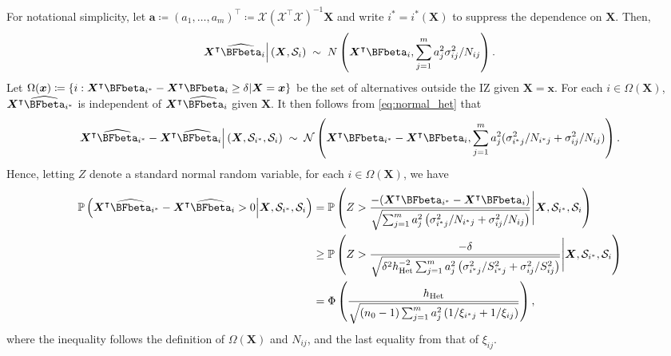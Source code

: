 \documentclass[ijoc,nonblindrev]{informs3}
\def\pr{\mathbb{P}}
\def\bx{{\bm x}}
\def\bX{{\bm X}}
\def\cN{{\mathcal N}}
\def\cX{{\mathcal X}}
\def\hhet{h_{\mathrm{Het}}}
\begin{document}
For notational simplicity, let $\bm a \coloneqq (a_1,\ldots,a_m)^\intercal \coloneqq \cX (\cX^\intercal \cX)^{-1} \bX$ and write $i^*=i^*(\bX)$ to suppress the dependence on $\bX$. Then,
\begin{equation}\label{eq:normal_het}
\bX^\intercal \widehat{\BFbeta}_i  \Big| \left(\bX, \mathcal{S}_i\right) \;\sim\;  N\left(\bX^\intercal \BFbeta_i,  \sum_{j=1}^m a_j^2 \sigma_{ij}^2 / N_{ij}\right).
\end{equation}
Let $\Omega(\bx) \coloneqq \{i: \bX^\intercal \BFbeta_{i^*} - \bX^\intercal \BFbeta_i  \geq \delta | \bX=\bx\}$ be the set of alternatives outside the IZ given $\bX=\bx$.
For each $i \in \Omega(\bX)$, $\bX^\intercal \widehat{\BFbeta}_{i^*}$ is independent of $\bX^\intercal \widehat{\BFbeta}_i$ given $\bX$. It then follows from \eqref{eq:normal_het} that
\begin{equation} \label{eq-normal2}
\bX^\intercal \widehat{\BFbeta}_{i^*} - \bX^\intercal \widehat{\BFbeta}_i  \Big| \left(\bX, \mathcal{S}_{i^*}, \mathcal{S}_i \right) \; \sim\; \cN\left(\bX^\intercal \BFbeta_{i^*} - \bX^\intercal \BFbeta_i,  \sum_{j=1}^m a_j^2 (\sigma_{i^*j}^2 / N_{i^*j}+\sigma_{ij}^2 / N_{ij}) \right).
\end{equation}
Hence, letting $Z$ denote a standard normal random variable, for each $i\in \Omega(\bX)$, we have
\begin{align}
 \pr \left(\bX^\intercal \widehat{\BFbeta}_{i^*} - \bX^\intercal \widehat{\BFbeta}_i  > 0 \Big| \bX,\mathcal{S}_{i^*}, \mathcal{S}_i \right)
&= \pr \left( Z > \frac{-( \bX^\intercal \BFbeta_{i^*} - \bX^\intercal \BFbeta_i)} { \sqrt{\sum_{j=1}^m a_j^2\left( \sigma_{i^*j}^2 / N_{i^*j}+\sigma_{ij}^2 / N_{ij} \right)} } \Bigg| \bX,\mathcal{S}_{i^*},\mathcal{S}_i \right)\nonumber \\
&\geq \pr \left( Z > \frac{-\delta} { \sqrt{\delta^2 \hhet^{-2} \sum_{j=1}^m a_j^2\left( \sigma_{i^*j}^2 / S_{i^*j}^2 + \sigma_{ij}^2 / S_{ij}^2 \right)} } \Bigg| \bX,\mathcal{S}_{i^*},\mathcal{S}_i \right)\nonumber \\
&= \Phi \left(\frac{\hhet} { \sqrt{ (n_0-1) \sum_{j=1}^m a_j^2 \left( 1/\xi_{i^*j} + 1/\xi_{ij} \right)} } \right), \label{eq-normalP20}
\end{align}
where  the inequality follows the definition of $\Omega(\bX)$ and $N_{ij}$, and the last equality from that of $\xi_{ij}$.
\end{document}
